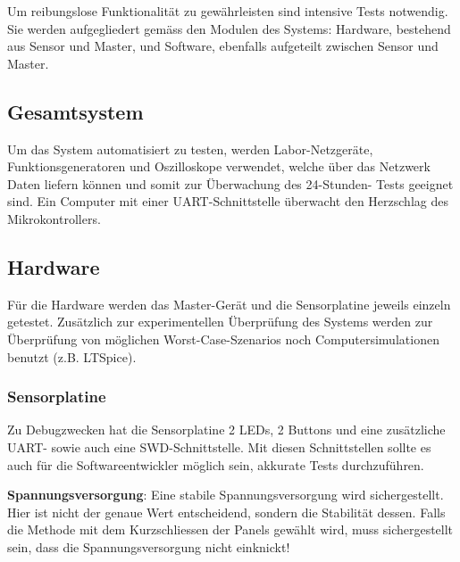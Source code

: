 Um  reibungslose  Funktionalit\"at  zu gew\"ahrleisten  sind  intensive  Tests
notwendig. Sie  werden   aufgegliedert  gem\"ass  den  Modulen   des  Systems:
Hardware, bestehend aus Sensor und  Master, und Software, ebenfalls aufgeteilt
zwischen Sensor und Master.


\subsection{Gesamtsystem}

Um   das   System   automatisiert  zu   testen,   werden   Labor-Netzger\"ate,
Funktionsgeneratoren und  Oszilloskope verwendet,  welche \"uber  das Netzwerk
Daten  liefern k\"onnen  und  somit zur  \"Uberwachung  des 24-Stunden-  Tests
geeignet  sind. Ein  Computer  mit einer  UART-Schnittstelle  \"uberwacht  den
Herzschlag des Mikrokontrollers.

\subsection{Hardware}

F\"ur die  Hardware werden  das Master-Ger\"at  und die  Sensorplatine jeweils
einzeln  getestet.   Zus\"atzlich   zur  experimentellen  \"Uberpr\"ufung  des
Systems werden  zur \"Uberpr\"ufung von m\"oglichen  Worst-Case-Szenarios noch
Computersimulationen benutzt (z.B. LTSpice).


\subsubsection{Sensorplatine}

Zu Debugzwecken hat die Sensorplatine 2 LEDs, 2 Buttons und eine zus\"atzliche
UART-  sowie auch  eine  SWD-Schnittstelle. Mit  diesen Schnittstellen  sollte
es   auch  f\"ur   die  Softwareentwickler   m\"oglich  sein,  akkurate  Tests
durchzuf\"uhren.

\textbf{Spannungsversorgung}: Eine     stabile    Spannungsversorgung     wird
sichergestellt. Hier  ist  nicht der  genaue  Wert  entscheidend, sondern  die
Stabilit\"at  dessen. Falls  die Methode  mit  dem  Kurzschliessen der  Panels
gew\"ahlt wird,  muss sichergestellt sein, dass  die Spannungsversorgung nicht
einknickt!

